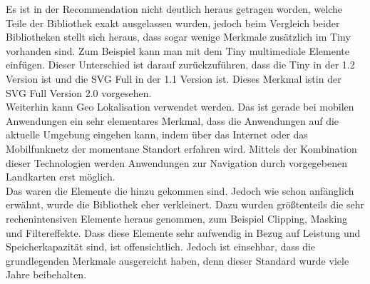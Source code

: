 Es ist in der Recommendation nicht deutlich heraus getragen worden, welche Teile der Bibliothek exakt ausgelassen wurden, jedoch beim Vergleich beider Bibliotheken stellt sich heraus, dass sogar wenige Merkmale zusätzlich im Tiny vorhanden sind. Zum Beispiel kann man mit dem Tiny multimediale Elemente einfügen. Dieser Unterschied ist darauf zurückzuführen, dass die Tiny in der 1.2 Version ist und die SVG Full in der 1.1 Version ist. Dieses Merkmal istin der SVG Full Version 2.0 vorgesehen.\\
Weiterhin kann Geo Lokalisation verwendet werden. Das ist gerade bei mobilen Anwendungen ein sehr elementares Merkmal, dass die Anwendungen auf die aktuelle Umgebung eingehen kann, indem über das Internet oder das Mobilfunknetz der momentane Standort erfahren wird. Mittels der Kombination dieser Technologien werden Anwendungen zur Navigation durch vorgegebenen Landkarten erst möglich.\\
Das waren die Elemente die hinzu gekommen sind. Jedoch wie schon anfänglich erwähnt, wurde die Bibliothek eher verkleinert. Dazu wurden größtenteils die sehr rechenintensiven Elemente heraus genommen, zum Beispiel Clipping, Masking und Filtereffekte. Dass diese Elemente sehr aufwendig in Bezug auf Leistung und Speicherkapazität sind, ist offensichtlich. Jedoch ist einsehbar, dass die grundlegenden Merkmale ausgereicht haben, denn dieser Standard wurde viele Jahre beibehalten.
